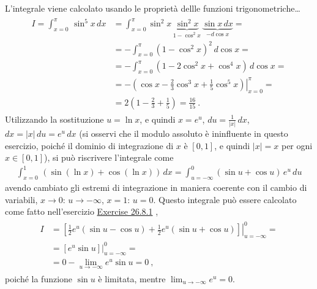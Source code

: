 \documentclass[letterpaper,10pt,italian]{jupyterBook}
\begin{document}
\sphinxAtStartPar
{}
L’integrale viene calcolato usando le proprietà dellle funzioni trigonometriche…
\begin{equation*}
\begin{split}\begin{aligned}
  I = \int_{x=0}^{\pi} \, \sin^5 x \, dx 
  & = \int_{x=0}^{\pi} \sin^2 x \, \underbrace{\sin^2 x}_{1-\cos^2 x} \, \underbrace{\sin x \, dx}_{- d \cos x} = \\
  & = - \int_{x=0}^{\pi} \left( 1-\cos^2 x \right)^2 \, d \cos x = \\
  & = - \int_{x=0}^{\pi} \left( 1- 2\cos^2 x + \cos^4 x \right) \, d \cos x = \\
  & = - \left.\left( \cos x - \frac{2}{3}\cos^3 x + \frac{1}{5}\cos^5 x \right) \right|_{x=0}^{\pi} = \\
  & = 2 \left( 1-\frac{2}{3}+\frac{1}{5} \right) = \frac{16}{15} \ .
\end{aligned}\end{split}
\end{equation*}
\sphinxAtStartPar
{} Utilizzando la sostituzione \(u = \ln x\), e quindi \(x = e^{u}\), \(du = \frac{1}{|x|} \, dx\), \(dx = |x| \, du = e^{u} \, dx\) (si osservi che il modulo assoluto è ininfluente in questo esercizio, poiché il dominio di integrazione di \(x\) è \([0,1]\), e quindi \(|x| = x\) per ogni \(x \in [0,1]\)), si può riscrivere l’integrale come
\begin{equation*}
\begin{split} \int_{x=0}^{1} \, \left( \sin (\ln x) + \cos(\ln x) \right) \, dx  = \int_{u = -\infty}^{0} \left( \sin u + \cos u \right) \, e^{u} \, du\end{split}
\end{equation*}
\sphinxAtStartPar
avendo cambiato gli estremi di integrazione in maniera coerente con il cambio di variabili, \(x \rightarrow 0\): \(u \rightarrow -\infty\), \(x = 1\): \(u = 0\). Questo integrale può essere calcolato come fatto nell’esercizio \hyperref[exercise:integral-ex-indefinite]{Exercise 26.8.1} , 
\begin{equation*}
\begin{split}\begin{aligned}
  I
  & = \left.\left[ \frac{1}{2} e^{u} ( \sin u - \cos u ) + \frac{1}{2} e^{u} (\sin u + \cos u)  \right]\right|_{u=-\infty}^{0} = \\
  & = \left.\left[ e^{u} \sin u \right]\right|_{u=-\infty}^{0} = \\
  & = 0 - \lim_{u \rightarrow -\infty} e^{u} \sin u = 0 \ ,
\end{aligned}\end{split}
\end{equation*}
\sphinxAtStartPar
poiché la funzione \(\sin u\) è limitata, mentre \(\lim_{u\rightarrow -\infty} e^{u} = 0\).
\end{document}
